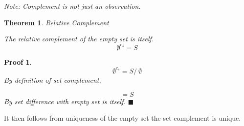 \documentclass{article}
\theoremstyle{theorem}
\newtheorem*{thm}{Theorem}
\newtheorem*{pf}{Proof}
\begin{document}

\textit{Note: Complement is not just an observation.}

\bigskip

\begin{thm}{Relative Complement}

The relative complement of the empty set is itself.
\[ \emptyset^{c_{s}} = S \] 
\end{thm}

\begin{pf}
\[ \emptyset^{c_{s}} = S/\ \emptyset \]
By definition of set complement.

\[ =S \]
By set difference with empty set is itself.
$\blacksquare$
\end{pf}

\bigskip

It then follows from uniqueness of the empty set the set complement is unique.
\end{document}
